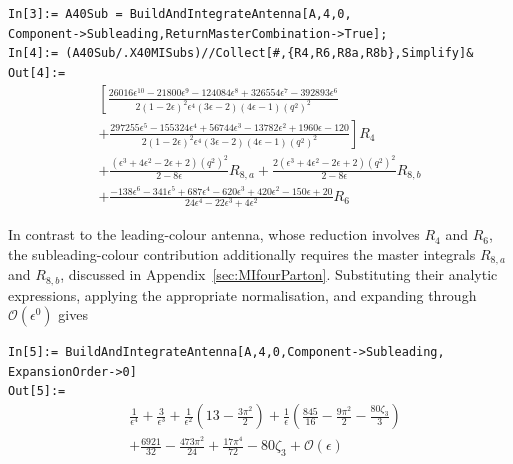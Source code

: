 \begin{mdframed}[backgroundcolor=gray!10, linewidth=0pt]
\texttt{In[3]:= A40Sub = BuildAndIntegrateAntenna[A,4,0,\\Component->Subleading,ReturnMasterCombination->True];}\\
\texttt{In[4]:= (A40Sub/.X40MISubs)//Collect[\#,\{R4,R6,R8a,R8b\},Simplify]\&}\\
\hfill
\texttt{Out[4]:=}
    \begin{equation*}
        \begin{gathered}
            \left[\frac{26016\epsilon^{10}-21800\epsilon^9-124084\epsilon^8+326554\epsilon^7-392893\epsilon^6}{2(1-2\epsilon)^2\epsilon^4(3\epsilon-2)(4\epsilon-1)\left(q^2\right)^2}\right.\\
            \left.+\frac{297255\epsilon^5-155324\epsilon^4+56744\epsilon^3-13782\epsilon^2+1960\epsilon-120}{2(1-2\epsilon)^2\epsilon^4(3\epsilon-2)(4\epsilon-1)\left(q^2\right)^2}\right]R_4\\
            +\frac{\left(\epsilon^3+4\epsilon^2-2\epsilon+2\right)\left(q^2\right)^2}{2-8\epsilon}R_{8,a}
            +\frac{2\left(\epsilon^3+4\epsilon^2-2\epsilon+2\right)\left(q^2\right)^2}{2-8\epsilon}R_{8,b}\\
            +\frac{-138\epsilon^6-341\epsilon^5+687\epsilon^4-620\epsilon^3+420\epsilon^2-150\epsilon+20}{24\epsilon^4-22\epsilon^3+4\epsilon^2}R_6
        \end{gathered}
    \end{equation*}
\end{mdframed}

In contrast to the leading-colour antenna, whose reduction involves $R_4$ and $R_6$, the
subleading-colour contribution additionally requires the master integrals $R_{8,a}$ and
$R_{8,b}$, discussed in Appendix~\ref{sec:MIfourParton}. Substituting their analytic
expressions, applying the appropriate normalisation, and expanding through
$\mathcal O(\epsilon^0)$ gives

\begin{mdframed}[backgroundcolor=gray!10, linewidth=0pt]
\texttt{In[5]:= BuildAndIntegrateAntenna[A,4,0,Component->Subleading,\\ExpansionOrder->0]}\\
\hfill
\texttt{Out[5]:=}
    \begin{equation*}
        \begin{split}
            &\frac1{\epsilon^4}+\frac3{\epsilon^3}+\frac1{\epsilon^2}\!\left(13-\frac{3\pi^2}2\right)+\frac1\epsilon\!\left(\frac{845}{16}-\frac{9\pi^2}{2}-\frac{80\zeta_3}{3}\right)\\
            &+\frac{6921}{32}-\frac{473\pi^2}{24}+\frac{17\pi^4}{72}-80\zeta_3+\mathcal O(\epsilon)
        \end{split}
    \end{equation*}
\end{mdframed}

